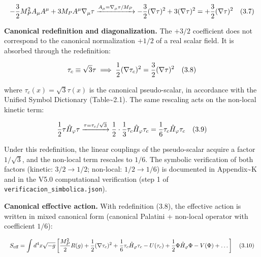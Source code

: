 ﻿\documentclass[11pt,letterpaper]{article}
\begin{document}
\begin{equation*}
  \resizebox{\ifdim\width>\linewidth \linewidth\else\width\fi}{!}{$\displaystyle -\frac{3}{2}M_P^2 A_\mu A^\mu + 3M_P A^\mu\nabla_\mu\tau \xrightarrow{A_\mu = \nabla_\mu\tau/M_P} -\frac{3}{2}(\nabla\tau)^2 + 3(\nabla\tau)^2 = +\frac{3}{2}(\nabla\tau)^2 \quad (3.7)$}
\end{equation*}

\textbf{Canonical redefinition and diagonalization.} The $+3/2$ coefficient does not correspond to the canonical normalization $+1/2$ of a real scalar field. It is absorbed through the redefinition:

\begin{equation*}
  \resizebox{\ifdim\width>\linewidth \linewidth\else\width\fi}{!}{$\displaystyle \tau_c \equiv \sqrt{3}\tau \implies \frac{1}{2}(\nabla\tau_c)^2 = \frac{3}{2}(\nabla\tau)^2 \quad (3.8)$}
\end{equation*}

where $\tau_c(x) = \sqrt{3}\tau(x)$ is the canonical pseudo-scalar, in accordance with the Unified Symbol Dictionary (Table\textasciitilde{}2.1). The same rescaling acts on the non-local kinetic term:

\begin{equation*}
  \resizebox{\ifdim\width>\linewidth \linewidth\else\width\fi}{!}{$\displaystyle \frac{1}{2}\tau\hat{H}_\varphi\tau \xrightarrow{\tau = \tau_c/\sqrt{3}} \frac{1}{2}\cdot\frac{1}{3}\tau_c\hat{H}_\varphi\tau_c = \frac{1}{6}\tau_c\hat{H}_\varphi\tau_c \quad (3.9)$}
\end{equation*}

Under this redefinition, the linear couplings of the pseudo-scalar acquire a factor $1/\sqrt{3}$, and the non-local term rescales to $1/6$. The symbolic verification of both factors (kinetic: $3/2 \to 1/2$; non-local: $1/2 \to 1/6$) is documented in Appendix\textasciitilde{}K and in the V5.0 computational verification (step 1 of \texttt{verificacion\_simbolica.json}).

\textbf{Canonical effective action.} With redefinition (3.8), the effective action is written in mixed canonical form (canonical Palatini + non-local operator with coefficient $1/6$):

\begin{equation*}
  \resizebox{\ifdim\width>\linewidth \linewidth\else\width\fi}{!}{$\displaystyle S_{\text{eff}} = \int d^4x\sqrt{-g}\left[\frac{M_P^2}{2}R(g) + \frac{1}{2}(\nabla\tau_c)^2 + \frac{1}{6}\tau_c\hat{H}_\varphi\tau_c - U(\tau_c) + \frac{1}{2}\Phi\hat{H}_\varphi\Phi - V(\Phi) + \dots\right] \quad (3.10)$}
\end{equation*}
\end{document}
